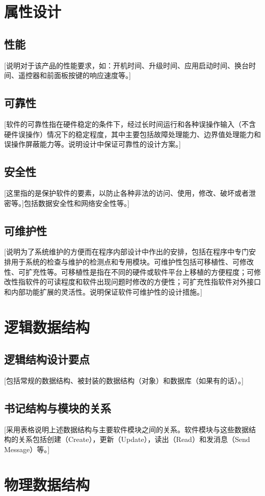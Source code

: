 \documentclass[UTF8]{ctexart}
\begin{document}
\section{属性设计}
      	\subsection{性能}
		 [说明对于该产品的性能要求，如：开机时间、升级时间、应用启动时间、换台时间、遥控器和前面板按键的响应速度等。]
	\subsection{可靠性}
		[软件的可靠性指在硬件稳定的条件下，经过长时间运行和各种误操作输入（不含硬件误操作）情况下的稳定程度，其中主要包括故障处理能力、边界值处理能力和误操作屏蔽能力等。说明设计中保证可靠性的设计方案。]
	\subsection{安全性}
		[这里指的是保护软件的要素，以防止各种非法的访问、使用，修改、破坏或者泄密等。]包括数据安全性和网络安全性等。]
	\subsection{可维护性}
		 [说明为了系统维护的方便而在程序内部设计中作出的安排，包括在程序中专门安排用于系统的检查与维护的检测点和专用模块。可维护性包括可移植性、可修改性、可扩充性等。可移植性是指在不同的硬件或软件平台上移植的方便程度；可修改性指软件的可读程度和软件出现问题时修改的方便性；可扩充性指软件对外接口和内部功能扩展的灵活性。说明保证软件可维护性的设计措施。]
\section{逻辑数据结构}
      	\subsection{逻辑结构设计要点}
		[包括常规的数据结构、被封装的数据结构（对象）和数据库（如果有的话）。]
	\subsection{书记结构与模块的关系}
		[采用表格说明上述数据结构与主要软件模块之间的关系。软件模块与这些数据结构的关系包括创建（Create），更新（Update），读出（Read）和发消息（Send Message）等。]
\section{物理数据结构}
\end{document}
